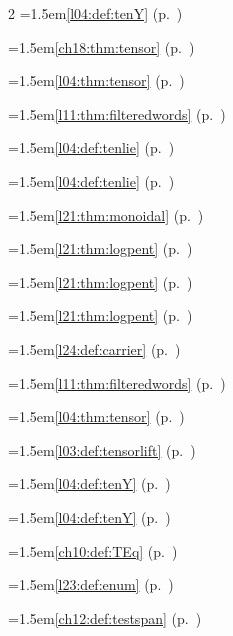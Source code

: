 \begin{multicols}{2}
\hangindent=1.5em\quad \ref{l04:def:tenY} (p.~\pageref{l04:def:tenY})\par
\hangindent=1.5em\quad \ref{ch18:thm:tensor} (p.~\pageref{ch18:thm:tensor})\par
\hangindent=1.5em\quad \ref{l04:thm:tensor} (p.~\pageref{l04:thm:tensor})\par
\hangindent=1.5em\quad \ref{l11:thm:filteredwords} (p.~\pageref{l11:thm:filteredwords})\par
\hangindent=1.5em\quad \ref{l04:def:tenlie} (p.~\pageref{l04:def:tenlie})\par
\hangindent=1.5em\quad \ref{l04:def:tenlie} (p.~\pageref{l04:def:tenlie})\par
\hangindent=1.5em\quad \ref{l21:thm:monoidal} (p.~\pageref{l21:thm:monoidal})\par
\hangindent=1.5em\quad \ref{l21:thm:logpent} (p.~\pageref{l21:thm:logpent})\par
\hangindent=1.5em\quad \ref{l21:thm:logpent} (p.~\pageref{l21:thm:logpent})\par
\hangindent=1.5em\quad \ref{l21:thm:logpent} (p.~\pageref{l21:thm:logpent})\par
\hangindent=1.5em\quad \ref{l24:def:carrier} (p.~\pageref{l24:def:carrier})\par
\hangindent=1.5em\quad \ref{l11:thm:filteredwords} (p.~\pageref{l11:thm:filteredwords})\par
\hangindent=1.5em\quad \ref{l04:thm:tensor} (p.~\pageref{l04:thm:tensor})\par
\hangindent=1.5em\quad \ref{l03:def:tensorlift} (p.~\pageref{l03:def:tensorlift})\par
\hangindent=1.5em\quad \ref{l04:def:tenY} (p.~\pageref{l04:def:tenY})\par
\hangindent=1.5em\quad \ref{l04:def:tenY} (p.~\pageref{l04:def:tenY})\par
\hangindent=1.5em\quad \ref{ch10:def:TEq} (p.~\pageref{ch10:def:TEq})\par
\hangindent=1.5em\quad \ref{l23:def:enum} (p.~\pageref{l23:def:enum})\par
\hangindent=1.5em\quad \ref{ch12:def:testspan} (p.~\pageref{ch12:def:testspan})\par

\end{multicols}
